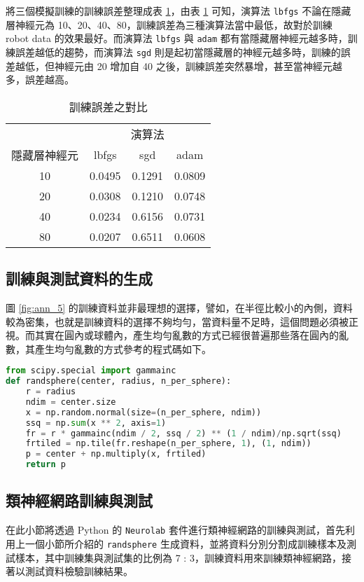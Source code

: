 將三個模擬訓練的訓練誤差整理成表 \ref{tb:ann_1}，由表 \ref{tb:ann_1} 可知，演算法 \verb|lbfgs| 不論在隱藏層神經元為 10、20、40、80，訓練誤差為三種演算法當中最低，故對於訓練 robot data 的效果最好。而演算法 \verb|lbfgs| 與 \verb|adam| 都有當隱藏層神經元越多時，訓練誤差越低的趨勢，而演算法 \verb|sgd| 則是起初當隱藏層的神經元越多時，訓練的誤差越低，但神經元由 20 增加自 40 之後，訓練誤差突然暴增，甚至當神經元越多，誤差越高。
\bigskip
\begin{table}[H] 
\centering
\caption{訓練誤差之對比}\label{tb:ann_1}
\tabcolsep=12pt
\begin{tabular}{cccc} 
\toprule
& \multicolumn{3}{c}{演算法}\\
\cmidrule(l){2-4}
隱藏層神經元 & lbfgs & sgd & adam\\[3pt]
\midrule
10 & \cellcolor{red!25}0.0495 & 0.1291 & 0.0809\\[3pt]
20 & \cellcolor{red!25}0.0308 & 0.1210 & 0.0748\\[3pt]
40 & \cellcolor{red!25}0.0234 & 0.6156 & 0.0731\\[3pt]
80 & \cellcolor{red!25}0.0207 & 0.6511 & 0.0608\\ 
\bottomrule
\end{tabular}
\end{table}

\subsection{訓練與測試資料的生成}
圖 \ref{fig:ann_5} 的訓練資料並非最理想的選擇，譬如，在半徑比較小的內側，資料較為密集，也就是訓練資料的選擇不夠均勻，當資料量不足時，這個問題必須被正視。而其實在圓內或球體內，產生均勻亂數的方式已經很普遍那些落在圓內的亂數，其產生均勻亂數的方式參考的程式碼如下。
\bigskip
\begin{lstlisting}[language = Python]
from scipy.special import gammainc
def randsphere(center, radius, n_per_sphere):
    r = radius
    ndim = center.size
    x = np.random.normal(size=(n_per_sphere, ndim))
    ssq = np.sum(x ** 2, axis=1)
    fr = r * gammainc(ndim / 2, ssq / 2) ** (1 / ndim)/np.sqrt(ssq)
    frtiled = np.tile(fr.reshape(n_per_sphere, 1), (1, ndim))
    p = center + np.multiply(x, frtiled)
    return p
\end{lstlisting}

\subsection{類神經網路訓練與測試}
在此小節將透過 Python 的 \verb|Neurolab| 套件進行類神經網路的訓練與測試，首先利用上一個小節所介紹的 \verb|randsphere| 生成資料，並將資料分別分割成訓練樣本及測試樣本，其中訓練集與測試集的比例為 7 : 3，訓練資料用來訓練類神經網路，接著以測試資料檢驗訓練結果。

